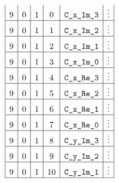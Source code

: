 \begin{figure}[h!]
\begin{adjustwidth}{-2cm}{-2cm}
{\[\begin{array}{|c|c|c|c|c|c|c|}
                9 & 0      & 1      & 0           & \texttt{C\_x\_Im\_3}             & \vdots                                                                                                                        \\ \hline
                9 & 0      & 1      & 1           & \texttt{C\_x\_Im\_2}               & \vdots                                                                                                                        \\ \hline
                9 & 0      & 1      & 2           & \texttt{C\_x\_Im\_1}               & \vdots                                                                                                                        \\ \hline
                9 & 0      & 1      & 3           & \texttt{C\_x\_Im\_0}              & \vdots                                                                                                                        \\ \hline
                9 & 0      & 1      & 4           & \texttt{C\_x\_Re\_3}             & \vdots                                                                                                                        \\ \hline
                9 & 0      & 1      & 5           & \texttt{C\_x\_Re\_2}               & \vdots                                                                                                                        \\ \hline
                9 & 0      & 1      & 6           & \texttt{C\_x\_Re\_1}               & \vdots                                                                                                                        \\ \hline
                9 & 0      & 1      & 7           & \texttt{C\_x\_Re\_0}              & \vdots                                                                                                                        \\ \hline
                9 & 0      & 1      & 8           & \texttt{C\_y\_Im\_3}             & \vdots                                                                                                                        \\ \hline
                9 & 0      & 1      & 9           & \texttt{C\_y\_Im\_2}               & \vdots                                                                                                                        \\ \hline
                9 & 0      & 1      & 10          & \texttt{C\_y\_Im\_1}               & \vdots                                                                                                                        \\ \hline

\end{array}\]}
\end{adjustwidth}
\end{figure}
